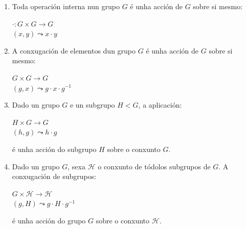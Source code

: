 \documentclass[twoside]{report}
\theoremstyle{mystyle}
\begin{document}
\begin{enumerate}
    
    \item Toda operación interna nun grupo $G$ é unha acción de $G$ sobre si mesmo:
    
    \begin{center}
    $\cdot : G \times G \longrightarrow G$ \\
    \vspace{2mm}
    \hspace{6mm} $(x,y) \leadsto x \cdot y$
    \end{center}  
    
    \item A conxugación de elementos dun grupo $G$ é unha acción de $G$ sobre si mesmo:
    
    \begin{center}
    $G \times G \longrightarrow G$ \\
    \vspace{2mm}
    \hspace{8mm} $(g,x) \leadsto g \cdot x \cdot g^{-1}$
    \end{center}  
    
    \item Dado un grupo $G$ e un subgrupo $H < G$, a aplicación:
    
    \begin{center}
    $H \times G \longrightarrow G$ \\
    \vspace{2mm}
    \hspace{1mm} $(h,g) \leadsto h \cdot g$
    \end{center}  
    
    é unha acción do subgrupo $H$ sobre o conxunto $G$.
    
    \item Dado un grupo $G$, sexa $\mathscr{H}$ o conxunto de tódolos subgrupos de $G$. A conxugación de subgrupos:
    
    \begin{center}
    $G \times \mathscr{H} \longrightarrow \mathscr{H}$ \\
    \vspace{2mm}
    \hspace{8mm} $(g,H) \leadsto g \cdot H \cdot g^{-1}$
    \end{center}  
    
    é unha acción do grupo $G$ sobre o conxunto $\mathscr{H}$.
    
\end{enumerate}
\end{document}
